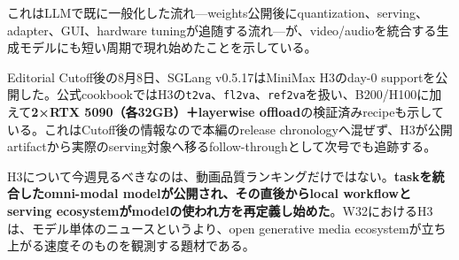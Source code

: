 これはLLMで既に一般化した流れ---weights公開後にquantization、serving、adapter、GUI、hardware tuningが追随する流れ---が、video/audioを統合する生成モデルにも短い周期で現れ始めたことを示している。

\begin{latebreaking}
Editorial Cutoff後の8月8日、SGLang v0.5.17はMiniMax H3のday-0 supportを公開した。公式cookbookではH3の\texttt{t2va}、\texttt{fl2va}、\texttt{ref2va}を扱い、B200/H100に加えて\textbf{2×RTX 5090（各32GB）＋layerwise offload}の検証済みrecipeも示している\cite{sglang-0517,sglang-h3-cookbook}。これはCutoff後の情報なので本編のrelease chronologyへ混ぜず、H3が公開artifactから実際のserving対象へ移るfollow-throughとして次号でも追跡する。
\end{latebreaking}

H3について今週見るべきなのは、動画品質ランキングだけではない。\textbf{taskを統合したomni-modal modelが公開され、その直後からlocal workflowとserving ecosystemがmodelの使われ方を再定義し始めた}。W32におけるH3は、モデル単体のニュースというより、open generative media ecosystemが立ち上がる速度そのものを観測する題材である。